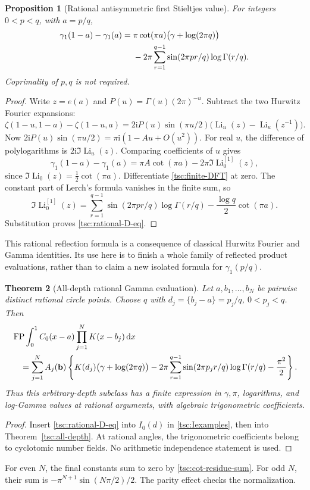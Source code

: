 \documentclass[11pt]{article}
\numberwithin{equation}{section}
\newtheorem{theorem}{Theorem}[section]
\newtheorem{proposition}[theorem]{Proposition}
\theoremstyle{definition}\newtheorem{definition}[theorem]{Definition}
\theoremstyle{remark}\newtheorem{remark}[theorem]{Remark}
\DeclareMathOperator{\Li}{Li}
\DeclareMathOperator{\FP}{FP}
\newcommand{\ii}{\mathrm i}
\newcommand{\dd}{\,\mathrm d}
\begin{document}
\begin{proposition}[Rational antisymmetric first Stieltjes value]\label{tsc:rational-D}
For integers $0<p<q$, with $a=p/q$,
\begin{align}\label{tsc:rational-D-eq}
 \gamma_1(1-a)-\gamma_1(a)
 ={}&\pi\cot(\pi a)\bigl(\gamma+\log(2\pi q)\bigr)\notag\\
 &-2\pi\sum_{r=1}^{q-1}\sin(2\pi pr/q)\log\Gamma(r/q).
\end{align}
Coprimality of $p,q$ is not required.
\end{proposition}
\begin{proof}
Write $z=e(a)$ and
$P(u)=\Gamma(u)(2\pi)^{-u}$. Subtract the two Hurwitz Fourier expansions:
\[
 \zeta(1-u,1-a)-\zeta(1-u,a)
      =2\ii P(u)\sin(\pi u/2)
                    \bigl(\Li_u(z)-\Li_u(z^{-1})\bigr).
\]
Now $2\ii P(u)\sin(\pi u/2)=\pi\ii(1-Au+O(u^2))$.
For real $u$, the difference of polylogarithms is $2\ii\Im\Li_u(z)$.
Comparing coefficients of $u$ gives
\[
 \gamma_1(1-a)-\gamma_1(a)
       =\pi A\cot(\pi a)-2\pi\Im\Li_0^{[1]}(z),
\]
since $\Im\Li_0(z)=\tfrac12\cot(\pi a)$.
Differentiate \eqref{tsc:finite-DFT} at zero. The constant part of Lerch's
formula vanishes in the finite sum, so
\[
 \Im\Li_0^{[1]}(z)=
     \sum_{r=1}^{q-1}\sin(2\pi pr/q)\log\Gamma(r/q)
                -\frac{\log q}{2}\cot(\pi a).
\]
Substitution proves \eqref{tsc:rational-D-eq}.
\end{proof}
This rational reflection formula is a consequence of classical Hurwitz
Fourier and Gamma identities. Its use here is to finish a whole family of
reflected product evaluations, rather than to claim a new isolated formula
for $\gamma_1(p/q)$.

\begin{theorem}[All-depth rational Gamma evaluation]\label{tsc:rational}
Let $a,b_1,\ldots,b_N$ be pairwise distinct rational circle points. Choose
$q$ with $d_j=\{b_j-a\}=p_j/q$, $0<p_j<q$. Then
\begin{align}\label{tsc:all-depth-gamma}
 &\FP\int_0^1 C_0(x-a)\prod_{j=1}^NK(x-b_j)\dd x\notag\\
 &\quad=\sum_{j=1}^N A_j(\mathbf b)
   \left\{K(d_j)\bigl(\gamma+\log(2\pi q)\bigr)
      -2\pi\sum_{r=1}^{q-1}\sin(2\pi p_jr/q)\log\Gamma(r/q)
      -\frac{\pi^2}{2}\right\}.
\end{align}
Thus this arbitrary-depth subclass has a finite expression in
$\gamma,\pi$, logarithms, and log-Gamma values at rational arguments,
with algebraic trigonometric coefficients.
\end{theorem}
\begin{proof}
Insert \eqref{tsc:rational-D-eq} into $I_0(d)$ in
\eqref{tsc:Iexamples}, then into Theorem~\ref{tsc:all-depth}.
At rational angles, the trigonometric coefficients belong to cyclotomic
number fields. No arithmetic independence statement is used.
\end{proof}
For even $N$, the final constants sum to zero by
\eqref{tsc:cot-residue-sum}. For odd $N$, their sum is
$-\pi^{N+1}\sin(N\pi/2)/2$. The parity effect checks the normalization.
\end{document}
